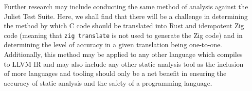\documentclass[conference]{IEEEtran}
\begin{document}
Further research may include conducting the same method of analysis against
the Juliet Test Suite. Here, we shall find that there will be a challenge in
determining the method by which C code should be translated into Rust and
idempotent Zig code (meaning that \texttt{zig translate} is not used to
generate the Zig code) and in determining the level of accuracy in a given
translation being one-to-one. Additionally, this method may be applied to
any other language which compiles to LLVM IR and may also include any other
static analysis tool as the inclusion of more languages and tooling should
only be a net benefit in ensuring the accuracy of static analysis and the
safety of a programming language.




\end{document}
